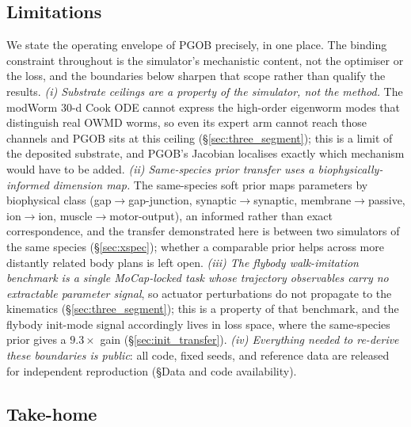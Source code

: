\documentclass[11pt]{article}
\begin{document}
\subsection{Limitations}
\label{sec:limitations}

We state the operating envelope of PGOB precisely, in one place. The binding constraint throughout is the simulator's mechanistic content, not the optimiser or the loss, and the boundaries below sharpen that scope rather than qualify the results. \emph{(i) Substrate ceilings are a property of the simulator, not the method.} The modWorm $30$-d Cook ODE cannot express the high-order eigenworm modes that distinguish real OWMD worms, so even its expert arm cannot reach those channels and PGOB sits at this ceiling (\S\ref{sec:three_segment}); this is a limit of the deposited substrate, and PGOB's Jacobian localises exactly which mechanism would have to be added. \emph{(ii) Same-species prior transfer uses a biophysically-informed dimension map.} The same-species soft prior maps parameters by biophysical class (gap$\to$gap-junction, synaptic$\to$synaptic, membrane$\to$passive, ion$\to$ion, muscle$\to$motor-output), an informed rather than exact correspondence, and the transfer demonstrated here is between two simulators of the same species (\S\ref{sec:xspec}); whether a comparable prior helps across more distantly related body plans is left open. \emph{(iii) The flybody walk-imitation benchmark is a single MoCap-locked task whose trajectory observables carry no extractable parameter signal}, so actuator perturbations do not propagate to the kinematics (\S\ref{sec:three_segment}); this is a property of that benchmark, and the flybody init-mode signal accordingly lives in loss space, where the same-species prior gives a $9.3\times$ gain (\S\ref{sec:init_transfer}). \emph{(iv) Everything needed to re-derive these boundaries is public}: all code, fixed seeds, and reference data are released for independent reproduction (\S Data and code availability).

\subsection{Take-home}
\end{document}
